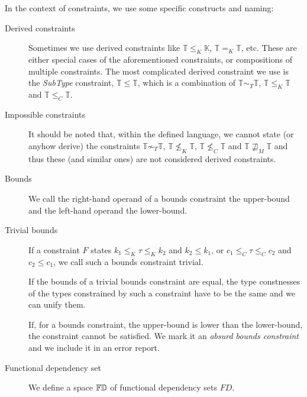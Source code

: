 In the context of constraints, we use some specific constructs and naming:
\begin{description}
    \item[Derived constraints] Sometimes we use derived constraints like $\mathbb{T} \leq_K \mathbb{K}$, $\mathbb{T} =_K \mathbb{T}$, etc. These are either special cases of the aforementioned constraints, or compositions of multiple constraints. The most complicated derived constraint we use is the \emph{SubType} constraint, $\mathbb{T} \leq \mathbb{T}$, which is a combination of $\mathbb{T} \sim_T \mathbb{T}$, $\mathbb{T} \leq_K \mathbb{T}$ and $\mathbb{T} \leq_C \mathbb{T}$.

    \item[Impossible constraints] It should be noted that, within the defined language, we cannot state (or anyhow derive) the constraints $\mathbb{T} \not\sim_T \mathbb{T}$, $\mathbb{T} \not\leq_K \mathbb{T}$, $\mathbb{T} \not\leq_C \mathbb{T}$ and $\mathbb{T} \not\sqsupseteq_M \mathbb{T}$ and thus these (and similar ones) are not considered derived constraints.

    \item[Bounds] We call the right-hand operand of a bounds constraint the upper-bound and the left-hand operand the lower-bound.

    \item[Trivial bounds] If a constraint $F$ states $k_1 \leq_K \tau \leq_K k_2$ and $k_2 \leq k_1$, or $c_1 \leq_C \tau \leq_C c_2$ and $c_2 \leq c_1$, we call such a bounds constraint trivial.

    If the bounds of a trivial bounds constraint are equal, the type constnesses of the types constrained by such a constraint have to be the same and we can unify them.

    If, for a bounds constraint, the upper-bound is lower than the lower-bound, the constraint cannot be satisfied. We mark it an \emph{absurd bounds constraint} and we include it in an error report.

    \item[Functional dependency set] We define a space $\mathbb{FD}$ of functional dependency sets $FD$.


\end{description}
